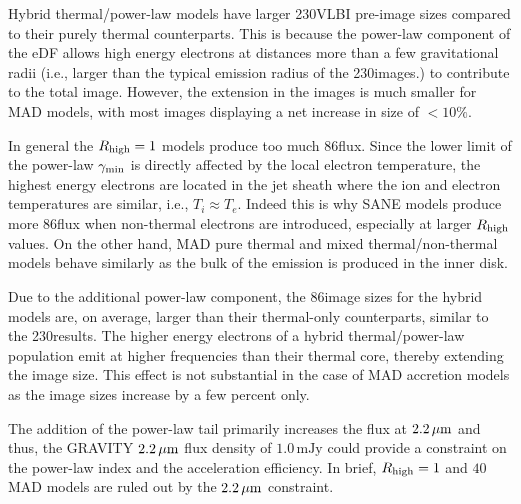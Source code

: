 Hybrid thermal/power-law models have larger 230\GHz VLBI pre-image sizes compared to their purely thermal counterparts.
This is because the power-law component of the eDF allows high energy electrons at distances more than a few gravitational radii (i.e., larger than the typical emission radius of the 230\GHz images.) to contribute to the total image.
However, the extension in the images is much smaller for MAD models, with most images displaying a net increase in size of $<10\%$.


In general the $R_{\rm high}=1$ models produce too much 86\GHz flux.
Since the lower limit of the power-law $\gamma_{\rm min}$ is directly affected by the local electron temperature, the highest energy electrons are located in the jet sheath where the ion and electron temperatures are similar, i.e., $T_i\approx T_e$.
Indeed this is why SANE models produce more 86\GHz flux when non-thermal electrons are introduced, especially at larger $R_{\rm high}$ values.
On the other hand, MAD pure thermal and mixed thermal/non-thermal models behave similarly as the bulk of the emission is produced in the inner disk.

Due to the additional power-law component, the 86\GHz image sizes for the hybrid \hamr models are, on average, larger than their thermal-only counterparts, similar to the 230\GHz results.
The higher energy electrons of a hybrid thermal/power-law population emit at higher frequencies than their thermal core, thereby extending the image size.
This effect is not substantial in the case of MAD accretion models as the image sizes increase by a few percent only.


The addition of the power-law tail primarily increases the flux at $2.2\,\mu\mathrm{m}$ and thus, the GRAVITY $2.2\,\mu\mathrm{m}$ flux density of $1.0\,\mathrm{mJy}$ could provide a constraint on the power-law index and the acceleration efficiency.
In brief, $R_\mathrm{high}=1$ and $40$ MAD models are ruled out by the $2.2\,\mu\mathrm{m}$ constraint.


